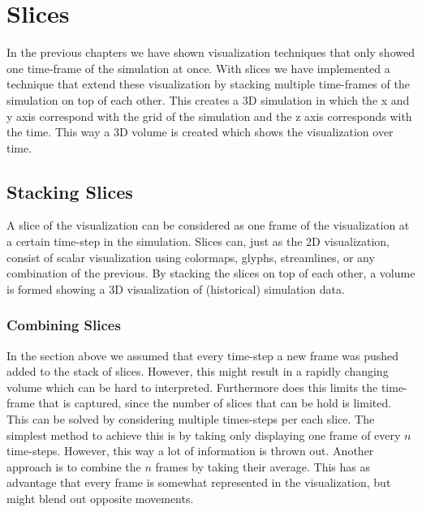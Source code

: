 \chapter{Slices} %
\label{cha:slices}
In the previous chapters we have shown visualization techniques that only showed one time-frame of the simulation at once. With slices we have implemented a technique that extend these visualization by stacking multiple time-frames of the simulation on top of each other. This creates a 3D simulation in which the x and y axis correspond with the grid of the simulation and the z axis corresponds with the time. This way a 3D volume is created which shows the visualization over time. 

\section{Stacking Slices} %
\label{sec:stacking_slices}
A slice of the visualization can be considered as one frame of the visualization at a certain time-step in the simulation. Slices can, just as the 2D visualization, consist of scalar visualization using colormaps, glyphs, streamlines, or any combination of the previous. By stacking the slices on top of each other, a volume is formed showing a 3D visualization of (historical) simulation data. 

\subsection{Combining Slices} %
\label{sub:combining_slices}
In the section above we assumed that every time-step a new frame was pushed added to the stack of slices. However, this might result in a rapidly changing volume which can be hard to interpreted. Furthermore does this limits the time-frame that is captured, since the number of slices that can be hold is limited. This can be solved by  considering multiple times-steps per each slice. The simplest method to achieve this is by taking only displaying one frame of every $n$ time-steps. However, this way a lot of information is thrown out. Another approach is to combine the $n$ frames by taking their average. This has as advantage that every frame is somewhat represented in the visualization, but might blend out opposite movements. 

